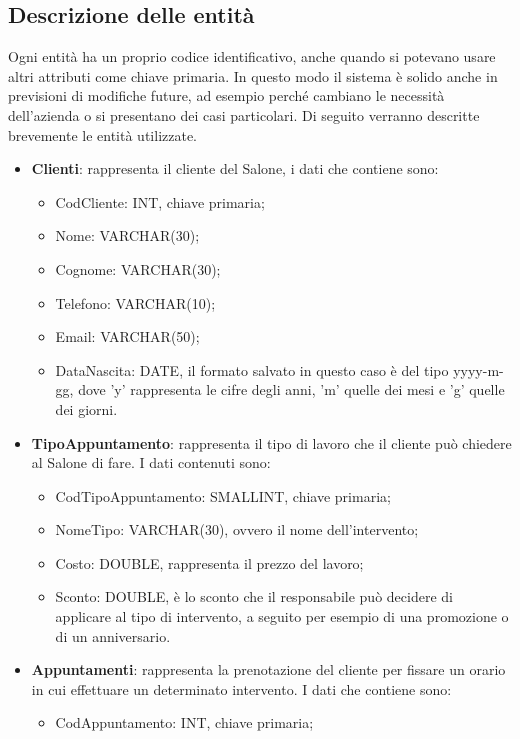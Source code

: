 {	\subsection{Descrizione delle entità}{
		Ogni entità ha un proprio codice identificativo, anche quando si potevano usare altri attributi come chiave primaria. In questo modo il sistema è solido anche in previsioni di modifiche future, ad esempio perché cambiano le necessità dell'azienda o si presentano dei casi particolari. Di seguito verranno descritte brevemente le entità utilizzate.
			\begin{itemize}\itemsep1pt
				\item \textbf{Clienti}: rappresenta il cliente del Salone, i dati che contiene sono:
					\begin{itemize}\itemsep1pt
						\item CodCliente: INT, chiave primaria;
						\item Nome: VARCHAR(30);
						\item Cognome: VARCHAR(30);
						\item Telefono: VARCHAR(10);
						\item Email: VARCHAR(50);
						\item DataNascita: DATE, il formato salvato in questo caso è del tipo yyyy-m-gg, dove 'y' rappresenta le cifre degli anni, 'm' quelle dei mesi e 'g' quelle dei giorni.
					\end{itemize}
				\item \textbf{TipoAppuntamento}: rappresenta il tipo di lavoro che il cliente può chiedere al Salone di fare. I dati contenuti sono:
					\begin{itemize}\itemsep1pt
						\item CodTipoAppuntamento: SMALLINT, chiave primaria;
						\item NomeTipo: VARCHAR(30), ovvero il nome dell'intervento;
						\item Costo: DOUBLE, rappresenta il prezzo del lavoro;
						\item Sconto: DOUBLE, è lo sconto che il responsabile può decidere di applicare al tipo di intervento, a seguito per esempio di una promozione o di un anniversario. 
					\end{itemize}
				\item \textbf{Appuntamenti}: rappresenta la prenotazione del cliente per fissare un orario in cui effettuare un determinato intervento. I dati che contiene sono:
					\begin{itemize}\itemsep1pt
						\item CodAppuntamento: INT, chiave primaria;

\end{itemize}
\end{itemize}}}
